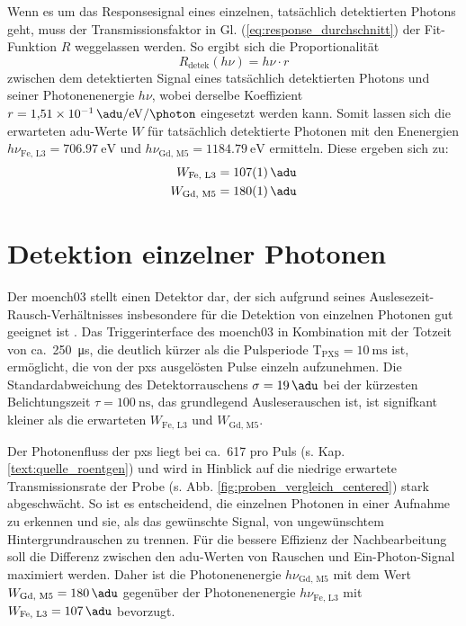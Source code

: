 \noindent
Wenn es um das Responsesignal eines einzelnen, tatsächlich detektierten Photons geht, muss der Transmissionsfaktor in Gl. (\ref{eq:response_durchschnitt}) der Fit-Funktion $R$ weggelassen werden. So ergibt sich die Proportionalität
\begin{equation}
    R_\text{detek}(h\nu) = h\nu \cdot r
    \label{eq:adu_to_ev}
\end{equation}
zwischen dem detektierten Signal eines tatsächlich detektierten Photons und seiner Photonenenergie $h\nu$, wobei derselbe Koeffizient $r = \SI[per-mode = symbol]{1.51e-1}{\adu\per\eV\per\photon}$ eingesetzt werden kann. Somit lassen sich die erwarteten \gls{adu}-Werte $W$ für tatsächlich detektierte Photonen mit den Enenergien $h\nu_{\text{Fe, L3}} = \SI{706.97}{\eV}$ und $h\nu_{\text{Gd, M5}} = \SI{1184.79}{\eV}$ ermitteln. Diese ergeben sich zu:
\begin{equation}
\begin{split}
     W_{\text{Fe, L3}} &=  \SI{107(1)}{\adu}\\
     W_{\text{Gd, M5}} &=  \SI{180(1)}{\adu}
\end{split}
\label{eq:auselesewerte_fe_gd}
\end{equation}


\section{Detektion einzelner Photonen}
\label{text:single_photon_theorie}
Der \gls{moench03} stellt einen Detektor dar, der sich aufgrund seines Auslesezeit-Rausch-Ver\-hält\-nis\-ses insbesondere für die Detektion von einzelnen Photonen gut geeignet ist \cite{bergamaschi_monch_2018}. Das Triggerinterface des \gls{moench03} in Kombination mit der Totzeit von ca.\ \SI{250}{\micro\second}, die deutlich kürzer als die Pulsperiode T$_\text{PXS} = \SI{10}{\milli\second}$ ist, ermöglicht, die von der \gls{pxs} ausgelösten Pulse einzeln aufzunehmen. Die Standardabweichung des Detektorrauschens $\sigma = \SI{19}{\adu}$ bei der kürzesten Belichtungszeit $\tau = \SI{100}{\nano\second}$, das grundlegend Ausleserauschen ist, ist signifkant kleiner als die erwarteten $W_{\text{Fe, L3}}$ und $W_{\text{Gd, M5}}$.

\noindent
Der Photonenfluss der \gls{pxs} liegt bei ca.\ \SI{617}{\photons} pro Puls (s. Kap. \ref{text:quelle_roentgen}) und wird in Hinblick auf die niedrige erwartete Transmissionsrate der Probe (s. Abb. \ref{fig:proben_vergleich_centered}) stark abgeschwächt. So ist es entscheidend, die einzelnen Photonen in einer Aufnahme zu erkennen und sie, als das gewünschte Signal, von ungewünschtem Hintergrundrauschen zu trennen. Für die bessere Effizienz der Nachbearbeitung soll die Differenz zwischen den \gls{adu}-Werten von Rauschen und Ein-Photon-Signal maximiert werden. Daher ist die Photonenenergie $h\nu_\text{Gd, M5}$ mit dem Wert $W_{\text{Gd, M5}} = \SI{180}{\adu}$ gegenüber der Photonenenergie $h\nu_\text{Fe, L3}$ mit $W_{\text{Fe, L3}} = \SI{107}{\adu}$ bevorzugt.

